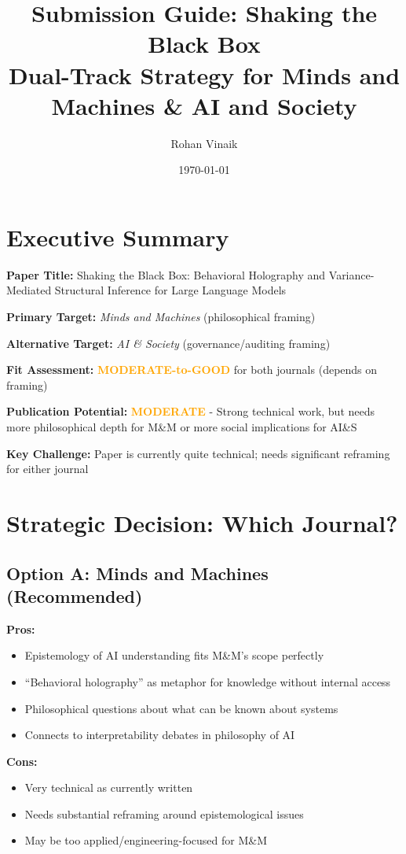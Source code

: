 \documentclass[12pt]{article}
\title{\textbf{Submission Guide: Shaking the Black Box}\\
\large Dual-Track Strategy for Minds and Machines \& AI and Society}
\author{Rohan Vinaik}
\date{\today}
\begin{document}
\maketitle

\section*{Executive Summary}

\textbf{Paper Title:} Shaking the Black Box: Behavioral Holography and Variance-Mediated Structural Inference for Large Language Models

\textbf{Primary Target:} \textit{Minds and Machines} (philosophical framing)

\textbf{Alternative Target:} \textit{AI \& Society} (governance/auditing framing)

\textbf{Fit Assessment:} \textcolor{orange}{\textbf{MODERATE-to-GOOD}} for both journals (depends on framing)

\textbf{Publication Potential:} \textcolor{orange}{\textbf{MODERATE}} - Strong technical work, but needs more philosophical depth for M\&M or more social implications for AI\&S

\textbf{Key Challenge:} Paper is currently quite technical; needs significant reframing for either journal

\section{Strategic Decision: Which Journal?}

\subsection{Option A: Minds and Machines (Recommended)}

\textbf{Pros:}
\begin{itemize}[leftmargin=*]
\item Epistemology of AI understanding fits M\&M's scope perfectly
\item ``Behavioral holography'' as metaphor for knowledge without internal access
\item Philosophical questions about what can be known about systems
\item Connects to interpretability debates in philosophy of AI
\end{itemize}

\textbf{Cons:}
\begin{itemize}[leftmargin=*]
\item Very technical as currently written
\item Needs substantial reframing around epistemological issues
\item May be too applied/engineering-focused for M\&M
\end{itemize}
\end{document}

